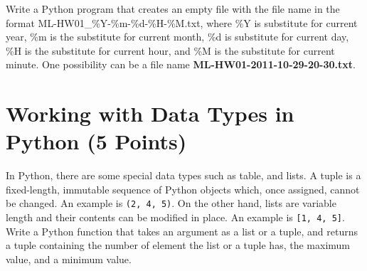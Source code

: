 \documentclass[12pt, xcolor=dvipsnames,svgnames,x11names]{article}
\begin{document}
Write a Python program that creates an empty file with the file name in the format ML-HW01\_\%Y-\%m-\%d-\%H-\%M.txt, where \%Y is substitute for current year,  \%m is the substitute for current month, \%d is substitute for current day, \%H is the substitute for current hour, and \%M is the substitute for current minute. One possibility can be a file name \textbf{ML-HW01-2011-10-29-20-30.txt}.



\section{Working with Data Types in Python (5 Points)}
In Python, there are some special data types such as table, and lists.
A tuple is a fixed-length, immutable sequence of Python objects which, once assigned,
cannot be changed. An example is \texttt{(2, 4, 5)}. On the other hand, lists are variable length and their contents can be modified in place. An example is \texttt{[1, 4, 5]}. Write a Python function that takes an argument as a list or a tuple, and returns a tuple containing the number of element the list or a tuple has, the maximum value, and a minimum value.

\end{document}
